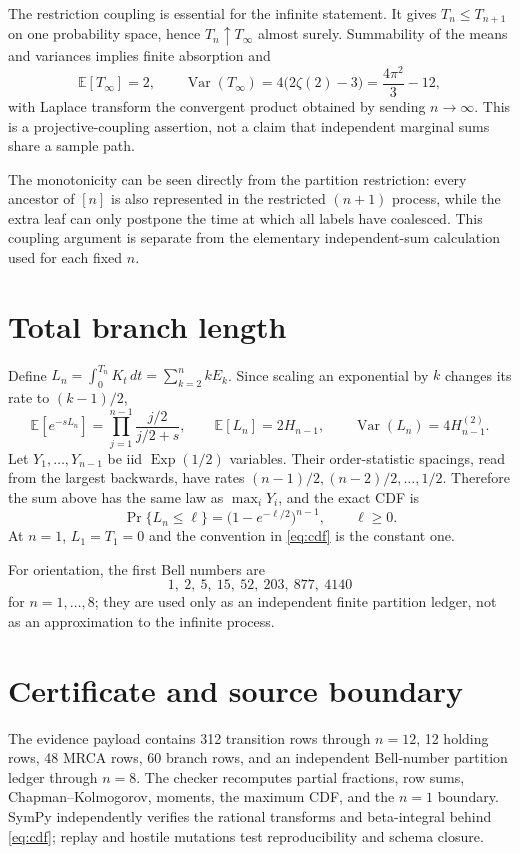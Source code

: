 \documentclass[10pt]{article}
\newcommand{\E}{\mathbb E}
\begin{document}
The restriction coupling is essential for the infinite statement.  It gives
$T_n\leq T_{n+1}$ on one probability space, hence $T_n\uparrow T_\infty$
almost surely.  Summability of the means and variances implies finite
absorption and
\[
\E[T_\infty]=2,\qquad
\operatorname{Var}(T_\infty)=4\bigl(2\zeta(2)-3\bigr)=\frac{4\pi^2}{3}-12,
\]
with Laplace transform the convergent product obtained by sending $n\to\infty$.
This is a projective-coupling assertion, not a claim that independent
marginal sums share a sample path.

The monotonicity can be seen directly from the partition restriction: every
ancestor of $[n]$ is also represented in the restricted $(n+1)$ process, while
the extra leaf can only postpone the time at which all labels have coalesced.
This coupling argument is separate from the elementary independent-sum
calculation used for each fixed $n$.

\section{Total branch length}
Define $L_n=\int_0^{T_n}K_t\,dt=\sum_{k=2}^{n}kE_k$.  Since scaling an
exponential by $k$ changes its rate to $(k-1)/2$,
\[
\E[e^{-sL_n}]=\prod_{j=1}^{n-1}\frac{j/2}{j/2+s},\qquad
\E[L_n]=2H_{n-1},\qquad
\operatorname{Var}(L_n)=4H_{n-1}^{(2)}.
\]
Let $Y_1,\ldots,Y_{n-1}$ be iid $\operatorname{Exp}(1/2)$ variables.  Their
order-statistic spacings, read from the largest backwards, have rates
$(n-1)/2,(n-2)/2,\ldots,1/2$.  Therefore the sum above has the same law as
$\max_iY_i$, and the exact CDF is
\begin{equation}
\Pr\{L_n\leq\ell\}=\bigl(1-e^{-\ell/2}\bigr)^{n-1},\qquad \ell\geq0.
\label{eq:cdf}
\end{equation}
At $n=1$, $L_1=T_1=0$ and the convention in \eqref{eq:cdf} is the constant one.

For orientation, the first Bell numbers are
\[
1,\ 2,\ 5,\ 15,\ 52,\ 203,\ 877,\ 4140
\]
for $n=1,\ldots,8$; they are used only as an independent finite partition
ledger, not as an approximation to the infinite process.

\section{Certificate and source boundary}
The evidence payload contains 312 transition rows through $n=12$, 12 holding
rows, 48 MRCA rows, 60 branch rows, and an independent Bell-number partition
ledger through $n=8$.  The checker recomputes partial fractions, row sums,
Chapman--Kolmogorov, moments, the maximum CDF, and the $n=1$ boundary.
SymPy independently verifies the rational transforms and beta-integral behind
\eqref{eq:cdf}; replay and hostile mutations test reproducibility and schema
closure.
\end{document}
